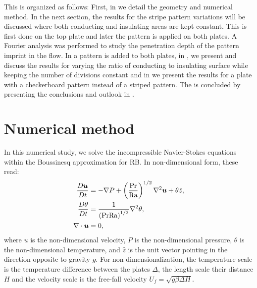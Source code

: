 This \docname is organized as follows: First, in 
we detail the geometry and numerical method.  In the next section, the results
for the stripe pattern variations will be discussed where both conducting and
insulating areas are kept constant.  This is first done on the top plate and
later the pattern is applied on both plates.  A Fourier analysis was performed
to study the penetration depth of the pattern imprint in the flow.  In
 a pattern is added to both plates, in
, we present and discuss the results for varying
the ratio of conducting to insulating surface while keeping the number of
divisions constant and in  we present the results
for a plate with a checkerboard pattern instead of a striped pattern.  The
\docname is concluded by presenting the conclusions and outlook in
.
\newpage
\section{Numerical method}\label{NumericalMethod}

In this numerical study, we solve the incompressible Navier-Stokes equations
within the Boussinesq approximation for RB. In non-dimensional form, these
read:
%
\begin{equation} \begin{aligned} \frac{D \boldsymbol{u}}{Dt} &= -\nabla P +
    \left( \frac{\text{Pr}}{\text{Ra}} \right)^{1/2} \nabla^2 \boldsymbol{u} + \theta
    \hat{z}, \\ \frac{D \theta}{Dt} &= \frac{1}{\left( \text{Pr} \text{Ra}
    \right)^{1/2}} \nabla^2 \theta, \\ \nabla \cdot \boldsymbol{u} &= 0,
\end{aligned} \end{equation}
%
where $u$ is the non-dimensional velocity, $P$ is the non-dimensional
pressure, $\theta$ is the non-dimensional temperature, and $\hat{z}$ is the
unit vector pointing in the direction opposite to gravity $g$.  For
non-dimensionalization, the temperature scale is the temperature difference
between the plates $\Delta$, the length scale their distance $H$ and the
velocity scale is the free-fall velocity $U_f = \sqrt{g\beta \Delta H}$.

